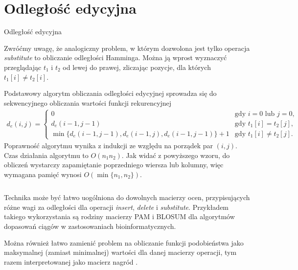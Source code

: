 \section{Odległość edycyjna}

\begin{algorithm}[H]
    \caption{Odległość edycyjna}
\end{algorithm}

Zwróćmy uwagę, że analogiczny problem, w którym dozwolona jest tylko operacja \emph{substitute} to obliczanie odległości Hamminga. Można ją wprost wyznaczyć przeglądając $t_1$ i $t_2$ od lewej do prawej, zliczając pozycje, dla których $t_1[i] \neq t_2[i]$.

Podstawowy algorytm obliczania odległości edycyjnej sprowadza się do sekwencyjnego obliczania wartości funkcji rekurencyjnej
\begin{align*}
  d_e(i, j) =
  \begin{cases}
    0 & \text{gdy $i = 0$ lub $j = 0$,} \\
    d_e(i - 1, j - 1) & \text{gdy $t_1[i] = t_2[j]$,} \\
    \min\{d_e(i - 1, j - 1), d_e(i - 1, j), d_e(i - 1, j - 1)\} + 1 & \text{gdy $t_1[i] \neq t_2[j]$.}
  \end{cases}
\end{align*}
Poprawność algorytmu wynika z indukcji ze względu na porządek par $(i, j)$. Czas działania algorytmu to $O(n_1 n_2)$.
Jak widać z powyższego wzoru, do obliczeń wystarczy zapamiętanie poprzedniego wiersza lub kolumny, więc wymagana pamięć wynosi $O(\min\{n_1, n_2\})$.

\begin{code}
\inputminted{python}{code/other/edit-distance.py}
\label{alg:edit-distance}
\end{code}

Technika może być łatwo uogólniona do dowolnych macierzy ocen, przypisujących różne wagi za odległości dla operacji \emph{insert}, \emph{delete} i \emph{substitute}. Przykładem takiego wykorzystania są rodziny macierzy PAM i BLOSUM dla algorytmów dopasowań ciągów w zastosowaniach bioinformatycznych.

Można również łatwo zamienić problem na obliczanie funkcji podobieństwa jako maksymalnej (zamiast minimalnej) wartości dla danej macierzy operacji, tym razem interpretowanej jako macierz nagród \citep{sellers1974theory}.

